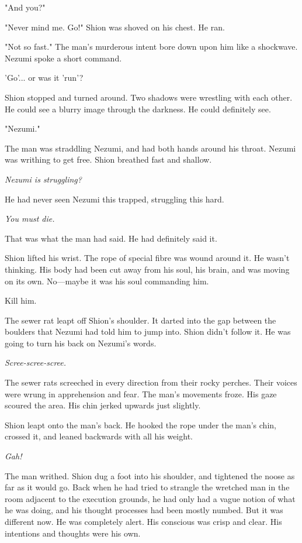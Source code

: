 "And you?"

"Never mind me. Go!" Shion was shoved on his chest. He ran.

"Not so fast." The man's murderous intent bore down upon him like a
shockwave. Nezumi spoke a short command.

'Go'... or was it 'run'?

Shion stopped and turned around. Two shadows were wrestling with each
other. He could see a blurry image through the darkness. He could
definitely see.

"Nezumi."

The man was straddling Nezumi, and had both hands around his throat.
Nezumi was writhing to get free. Shion breathed fast and shallow.

\emph{Nezumi is struggling?}

He had never seen Nezumi this trapped, struggling this hard.

\emph{You must die.}

That was what the man had said. He had definitely said it.

Shion lifted his wrist. The rope of special fibre was wound around it.
He wasn't thinking. His body had been cut away from his soul, his brain,
and was moving on its own. No---maybe it was his soul commanding him.

Kill him.

The sewer rat leapt off Shion's shoulder. It darted into the gap between
the boulders that Nezumi had told him to jump into. Shion didn't follow
it. He was going to turn his back on Nezumi's words.

\emph{Scree-scree-scree.}

The sewer rats screeched in every direction from their rocky perches.
Their voices were wrung in apprehension and fear. The man's movements
froze. His gaze scoured the area. His chin jerked upwards just slightly.

Shion leapt onto the man's back. He hooked the rope under the man's
chin, crossed it, and leaned backwards with all his weight.

\emph{Gah!}

The man writhed. Shion dug a foot into his shoulder, and tightened the
noose as far as it would go. Back when he had tried to strangle the
wretched man in the room adjacent to the execution grounds, he had only
had a vague notion of what he was doing, and his thought processes had
been mostly numbed. But it was different now. He was completely alert.
His conscious was crisp and clear. His intentions and thoughts were his
own.

